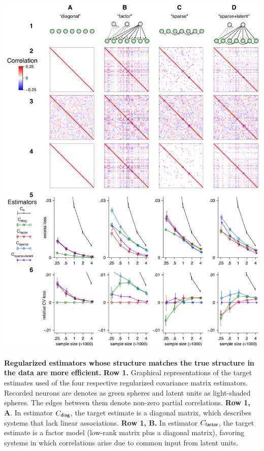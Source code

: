 \documentclass[10pt]{article}
\begin{document}
\begin{FPfigure}
    \begin{center}
        \includegraphics{./figures/Figure02.pdf}
    \end{center}
    \caption{{\bf Regularized estimators whose structure matches the true structure in the data are more efficient.}
        {\bf Row 1.} Graphical representations of the target estimates used of the four respective regularized covariance matrix estimators.  Recorded neurons are denotes as green spheres and latent units as light-shaded spheres.  The edges between them denote non-zero partial correlations.
        {\bf Row 1, A}.  In estimator $C_{\sf diag}$, the target estimate is a diagonal matrix, which describes systems that lack linear associations. 
        {\bf  Row 1, B.} In estimator $C_{\sf factor}$, the target estimate is a factor model (low-rank matrix plus a diagonal matrix), favoring systems in which correlations arise due to common input from latent units. 
}
\end{FPfigure}
\end{document}

